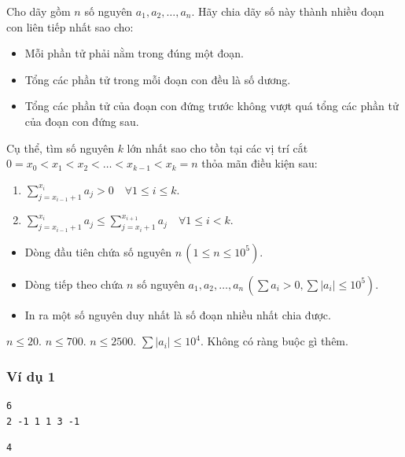 
Cho dãy gồm $n$ số nguyên $a_1, a_2, \dots, a_n$. Hãy chia dãy số này thành nhiều đoạn con liên tiếp nhất sao cho:

\begin{itemize}
    \item Mỗi phần tử phải nằm trong đúng một đoạn.
    \item Tổng các phần tử trong mỗi đoạn con đều là số dương.
    \item Tổng các phần tử của đoạn con đứng trước không vượt quá tổng các phần tử của đoạn con đứng sau.
\end{itemize}

\noindent Cụ thể, tìm số nguyên $k$ lớn nhất sao cho tồn tại các vị trí cắt $0 = x_0 < x_1 < x_2 < \dots < x_{k-1} < x_k = n$ thỏa mãn điều kiện sau:
\begin{enumerate}
    \item $\sum_{j=x_{i-1}+1}^{x_i} a_j > 0 \quad \forall 1 \le i \le k$.
    \item $\sum_{j=x_{i-1}+1}^{x_i} a_j \le \sum_{j=x_{i}+1}^{x_{i+1}} a_j \quad \forall 1 \le i < k$.
\end{enumerate}

\begin{itemize}
    \item Dòng đầu tiên chứa số nguyên $n \, (1 \le n \le 10^{5})$.
    \item Dòng tiếp theo chứa $n$ số nguyên $a_1, a_2, \dots, a_n \, \left(\sum{a_i} > 0, \sum{|a_i|} \le 10^{5}\right)$.
\end{itemize}

\begin{itemize}
    \item In ra một số nguyên duy nhất là số đoạn nhiều nhất chia được.
\end{itemize}

\begin{makesubtasks}
     $n \le 20$.
     $n \le 700$.
     $n \le 2500$.
     $\sum{|a_i|} \le 10^{4}$.
     Không có ràng buộc gì thêm.
\end{makesubtasks}


\subsubsection*{Ví dụ 1}
\begin{makesample}
\begin{lstlisting}
6
2 -1 1 1 3 -1
\end{lstlisting}
\nextsample
\begin{lstlisting}
4
\end{lstlisting}
\end{makesample}
